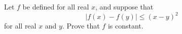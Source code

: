 \begin{exercise}
	Let $f$ be defined for all real $x$, and suppose that
	\begin{equation*}
	\left| f(x) - f(y) \right| \leq \left( x - y \right)^2
	\end{equation*}
	for all real $x$ and $y$. Prove that $f$ is constant.
\end{exercise}
